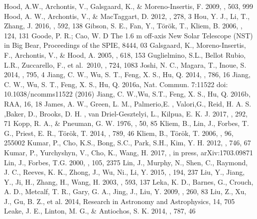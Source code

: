 \documentclass[12pt,preprint]{aastex}
\begin{document}
\begin{CJK*}{UTF8}{gbsn}
\begin{thebibliography}{}
 Hood, A.W., Archontis, V., Galsgaard, K., \& Moreno-Insertis, F. 2009, \aap, 503, 999
 Hood, A. W., Archontis, V., \& MacTaggart, D. 2012, \solphys, 278, 3
 Hou, Y. J., Li, T., Zhang, J. 2016, \aap, 592, 138
 Gibson, S. E., Fan, Y., T{\"o}r{\"o}k, T., Kliem, B. 2006, \ssr, 124, 131
 Goode, P. R.; Cao, W. D The 1.6 m off-axis New Solar Telescope (NST) in Big Bear, Proceedings of the SPIE, 8444, 03
 Galsgaard, K., Moreno-Insertis, F., Archontis, V., \& Hood, A. 2005, \apjl, 618, 153
 Guglielmino, S.L., Bellot Rubio, L.R., Zuccarello, F., et al.\ 2010, \apj, 724, 1083
  Joshi, N. C., Magara, T., Inoue, S. 2014, \apj, 795, 4
 Jiang, C. W., Wu, S. T., Feng, X. S., Hu, Q. 2014, \apjl, 786, 16
 Jiang, C. W., Wu, S. T., Feng, X. S., Hu, Q. 2016a, Nat. Commun. 7:11522 doi: 10.1038/ncomms11522 (2016)
 Jiang, C. W.,Wu, S.T., Feng, X. S., Hu, Q. 2016b, RAA, 16, 18
  James, A. W., Green, L. M., Palmerio,E. , Valori,G., Reid, H. A. S. ,Baker, D., Brooks, D. H. , van Driel-Gesztelyi, L., Kilpua, E. K. J. 2017, \solphys, 292, 71
 Kopp, R. A., \& Pneuman, G. W. 1976, \solphys, 50, 85
 Kliem, B., Lin, J., Forbes, T. G., Priest, E. R., T{\"o}r{\"o}k, T. 2014, \apj, 789, 46
 Kliem, B., T{\"o}r{\"o}k, T. 2006, \prl, 96, 255002
 Kumar, P., Cho, K.S., Bong, S.C., Park, S.H., Kim, Y. H. 2012, \apj, 746, 67
 Kumar, P., Yurchyshyn, V., Cho, K., Wang, H. 2017, \aap, in press, arXiv:1703.09871
 Lin, J., Forbes, T.G. 2000, \jgr, 105, 2375
 Lin, J., Murphy, N., Shen, C., Raymond, J. C., Reeves, K. K., Zhong, J., Wu, Ni., Li, Y. 2015, \ssr, 194, 237
 Liu, Y., Jiang, Y., Ji, H., Zhang, H., Wang, H. 2003, \apjl, 593, 137
 Leka, K. D., Barnes, G., Crouch, A. D., Metcalf, T. R., Gary, G. A., Jing, J., Liu, Y. 2009, \solphys, 260, 83
 Liu, Z., Xu, J., Gu, B. Z., et al. 2014, Research in Astronomy and Astrophysics, 14, 705
 Leake, J. E., Linton, M. G., \& Antiochos, S. K. 2014, \apj, 787, 46 

\end{thebibliography}
\end{CJK*}
\end{document}
